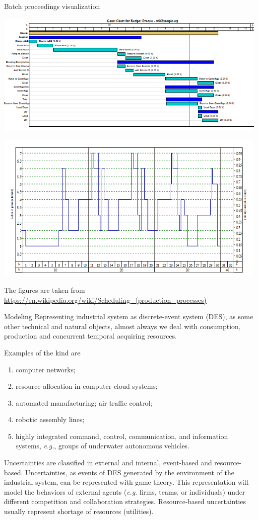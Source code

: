 \documentclass[10pt,dvipsnames]{beamer}
\begin{document}
\begin{frame}{Batch proceedings visualization}

\includegraphics[width=0.7\linewidth]{pics/BatchGantt1.png}

\hfill    \includegraphics[width=0.7\linewidth]{pics/BatchLabor1.png}

    \noindent The figures are taken from \url{https://en.wikipedia.org/wiki/Scheduling_(production_processes)}
\end{frame}


\begin{frame}{Modeling}
  Representing industrial system as discrete-event system (DES), as some other technical and natural objects, almost always we deal with consumption, production and concurrent temporal acquiring resources.

  Examples of the kind are
  \begin{enumerate}
  \item computer networks;
  \item resource allocation in computer cloud systems;
  \item automated manufacturing; air traffic control;
  \item robotic assembly lines;
  \item highly integrated command, control, communication, and information systems, \emph{e.g.}, groups of underwater autonomous vehicles.
  \end{enumerate}

  \alert{Uncertainties} are classified in \alert{external} and \alert{internal}, \alert{event-based} and \alert{resource-based}.  Uncertainties, as events of DES generated by the environment of the industrial system, can be represented with game theory.  This representation will model the behaviors of external agents (\emph{e.g.} firms, teams, or individuals) under different \alert{competition} and \alert{collaboration} strategies.  Resource-based uncertainties usually represent shortage of resources (utilities).
\end{frame}
\end{document}
